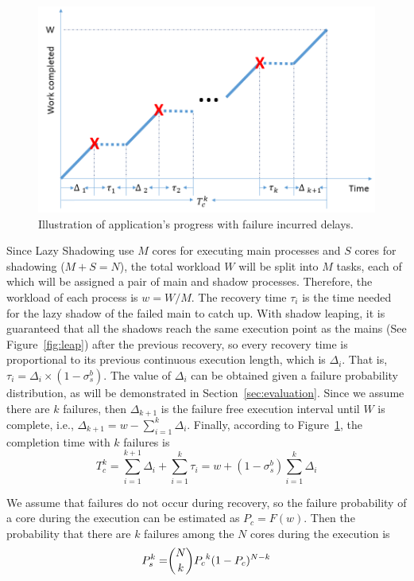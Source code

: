 \begin{figure}[!t]
	\begin{center}
		\includegraphics[width=\columnwidth]{Figures/progress}
	\end{center}
	\caption{Illustration of application's progress with failure incurred delays.}
	\label{fig:progress}
\end{figure}

Since Lazy Shadowing use $M$ cores for executing main processes and $S$ cores for shadowing ($M+S=N$), the total workload $W$ will be split into $M$ tasks, each of which will be assigned a pair of main and shadow processes. Therefore, the workload of each process is 
$w=W/M$. The recovery time $\tau_i$ is the time needed for the lazy shadow of the failed main to catch up. With shadow leaping, it is guaranteed that all the shadows reach the same execution point as the mains (See Figure~\ref{fig:leap}) after the previous recovery, so every recovery time is proportional to its previous continuous execution length, which is $\Delta_i$. That is, $\tau_i = \Delta_i \times (1 - \sigma_s^b)$. The value of $\Delta_i$ can be obtained given a failure probability distribution, as will be demonstrated in Section~\ref{sec:evaluation}. 
Since we assume there are $k$ failures, then $\Delta_{k+1}$ is the failure free execution interval until $W$ is complete, i.e., $\Delta_{k+1} = w - \sum_{i=1}^{k}\Delta_i$. Finally, according to Figure~\ref{fig:progress}, the completion time with $k$ failures is 
\begin{equation}
	T_c^k = \sum_{i=1}^{k+1}\Delta_i + \sum_{i=1}^k\tau_i = w + (1-\sigma_s^b)\sum_{i=1}^k\Delta_i
	\label{eq:time_k}
\end{equation}

We assume that failures do not occur during recovery, so the failure probability of a core during the execution can be estimated as $P_c = F(w)$. Then the probability that there are $k$ failures among the $N$ cores during the execution is 
\begin{equation}
\begin{split}
P_s^{k}= & \dbinom{N}{k}{P_c}^k(1-P_c)^{N-k} \\
\end{split}
\end{equation}


